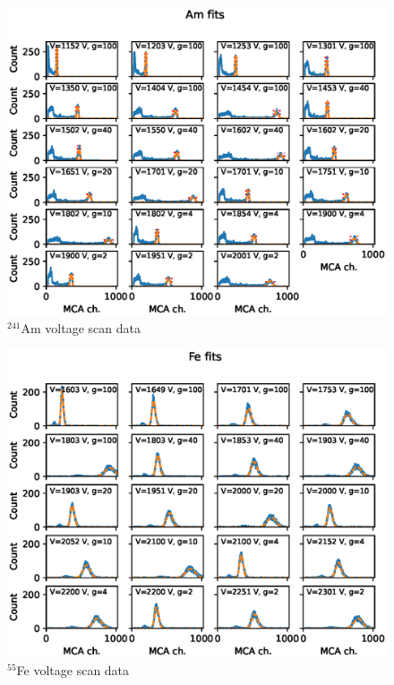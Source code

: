 \documentclass[a4paper]{article}
\begin{document}
\begin{figure}[ht!]
\centering
\includegraphics[width=\textwidth]{fig/python/am_scan_fits.eps}
\caption{$^{241}$Am voltage scan data}
\label{fig:am_scan_fits}
\end{figure}

\begin{figure}[ht!]
\centering
\includegraphics[width=\textwidth]{fig/python/fe_scan_fits.eps}
\caption{$^{55}$Fe voltage scan data}
\label{fig:fe_scan_fits}
\end{figure}

\FloatBarrier
\end{document}
